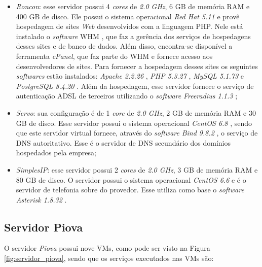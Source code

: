 \begin{itemize}
 \item \textit{Roncon}: esse servidor possui 4 \textit{cores} de \textit{2.0 GHz}, 6 GB de memória \ac{RAM} e 400 GB de disco. 
 Ele possui o sistema operacional \textit{Red Hat 5.11} \cite{redhat} e provê hospedagem de sites \textit{Web} desenvolvidos com a linguagem 
 \ac{PHP}. Nele está instalado o \textit{software} \ac{WHM} \cite{whm}, que faz a gerência dos serviços de hospedagens desses sites e de banco de 
 dados. Além disso, encontra-se disponível a ferramenta \textit{cPanel}, que faz parte do \ac{WHM} e fornece acesso aos desenvolvedores de
 sites. Para fornecer a hospedagem desses sites os seguintes \textit{softwares} estão instalados: \textit{Apache 2.2.26} \cite{apache}, 
 \textit{\ac{PHP} 5.3.27} \cite{php}, \textit{MySQL 5.1.73} \cite{mysql} e \textit{PostgreSQL 8.4.20} \cite{postgres}.
 Além da hospedagem, esse servidor fornece o serviço de autenticação \ac{ADSL} \cite{tanenbaum2011} de terceiros utilizando o \textit{software} 
 \textit{Freeradius 1.1.3} \cite{freeradius};
 
 \item \textit{Servo}: sua configuração é de 1 \textit{core} de \textit{2.0 GHz}, 2 GB de memória \ac{RAM} e 30 GB de disco. 
 Esse servidor possui o sistema operacional \textit{CentOS 6.8} \cite{centos}, sendo que este servidor virtual fornece, através do \textit{software} 
 \textit{Bind 9.8.2} \cite{bind}, o serviço de \ac{DNS} autoritativo. Esse é o servidor de \ac{DNS} secundário dos domínios hospedados pela empresa;
 
 \item \textit{SimplesIP}: esse servidor possui 2 \textit{cores} de \textit{2.0 GHz}, 3 GB de memória \ac{RAM} e 80 GB de disco. 
 O servidor possui o sistema operacional \textit{CentOS 6.6} \cite{centos} e é o servidor de telefonia sobre  do provedor. Esse utiliza 
 como base o \textit{software} \textit{Asterisk 1.8.32} \cite{asterisk}.
\end{itemize}

\subsection{Servidor Piova}
\label{section:serv_piova}

O servidor \textit{Piova} possui nove \acp{VM}, como pode ser visto na Figura \ref{fig:servidor_piova}, sendo que os serviços executados nas 
\acp{VM} são:

